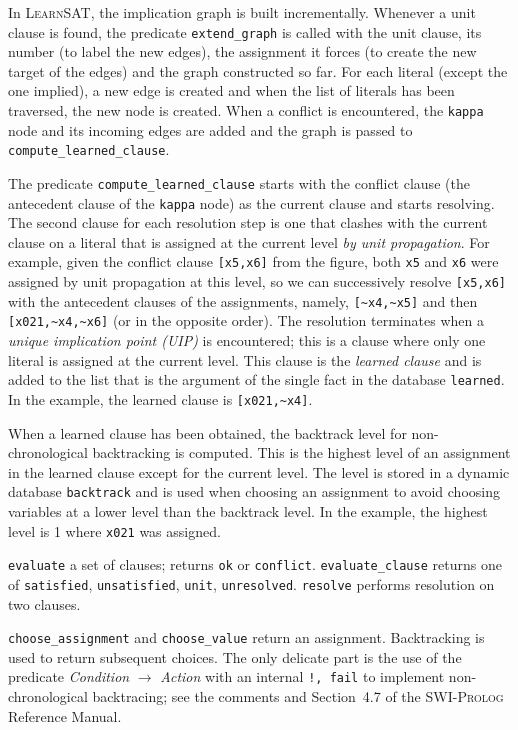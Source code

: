 \documentclass[11pt]{article}
\newcommand*{\p}[1]{\textup{\texttt{#1}}}
\newcommand*{\ls}{\textsc{LearnSAT}}
\newcommand*{\sw}{\textsc{SWI-Prolog}}
\begin{document}
In \ls{}, the implication graph is built incrementally. Whenever a unit
clause is found, the predicate \p{extend\_graph} is called with the unit
clause, its number (to label the new edges), the assignment it forces
(to create the new target of the edges) and the graph constructed so
far. For each literal (except the one implied), a new edge is created
and when the list of literals has been traversed, the new node is
created. When a conflict is encountered, the \p{kappa} node and its
incoming edges are added and the graph is passed to
\p{compute\_learned\_clause}.

The predicate \p{compute\_learned\_clause} starts with the conflict
clause (the antecedent clause of the \p{kappa} node) as the current
clause and starts resolving. The second clause for each resolution step
is one that clashes with the current clause on a literal that is
assigned at the current level \emph{by unit propagation}. For example,
given the conflict clause \p{[x5,x6]} from the figure, both \p{x5} and
\p{x6} were assigned by unit propagation at this level, so we can
successively resolve \p{[x5,x6]} with the antecedent clauses of the
assignments, namely, \verb+[~x4,~x5]+ and then \verb+[x021,~x4,~x6]+ (or
in the opposite order). The resolution terminates when a \emph{unique
implication point (UIP)} is encountered; this is a clause where only one
literal is assigned at the current level. This clause is the
\emph{learned clause} and is added to the list that is the argument of
the single fact in the database \p{learned}. In the example, the learned
clause is \verb+[x021,~x4]+.

When a learned clause has been obtained, the backtrack level for
non-chronological backtracking is computed. This is the highest level of
an assignment in the learned clause except for the current level. The
level is stored in a dynamic database \p{backtrack} and is used when
choosing an assignment to avoid choosing variables at a lower level than
the backtrack level. In the example, the highest level is 1 where
\p{x021} was assigned.

\p{evaluate} a set of clauses; returns \p{ok} or \p{conflict}.
\p{evaluate\_clause} returns one of \p{satisfied}, \p{unsatisfied},
\p{unit}, \p{unresolved}.
\p{resolve} performs resolution on two clauses.

\p{choose\_assignment} and \p{choose\_value} return an assignment.
Backtracking is used to return subsequent choices.
The only delicate part is the use of the predicate \emph{Condition}
$\rightarrow$ \emph{Action} with an internal \p{!, fail} to implement
non-chronological backtracing; see the comments and Section~4.7 of the
\sw{} Reference Manual.
\end{document}
